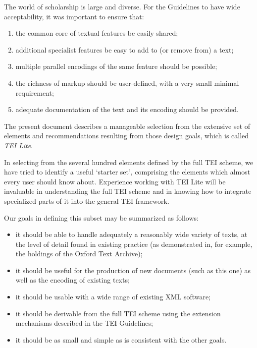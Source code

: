 \documentclass[11pt,twoside]{article}\makeatletter
\begin{document}
The world of scholarship is large and diverse. For the Guidelines to have wide acceptability, it was important to ensure that: \begin{enumerate}

\item the common core of textual features be easily shared;
\item additional specialist features be easy to add to (or remove from) a text;
\item multiple parallel encodings of the same feature should be possible;
\item the richness of markup should be user-defined, with a very small minimal requirement;
\item adequate documentation of the text and its encoding should be provided.
\end{enumerate}\par
The present document describes a manageable selection from the extensive set of elements and recommendations resulting from those design goals, which is called \textit{TEI Lite}.\par
In selecting from the  several hundred elements defined by the full TEI scheme, we have tried to identify a useful ‘starter set’, comprising the elements which almost every user should know about.  Experience working with TEI Lite will be invaluable in understanding the full TEI scheme and in knowing how to integrate specialized parts of it into the general TEI framework.\par
Our goals in defining this subset may be summarized as follows: \begin{itemize}

\item it should be able to handle adequately a reasonably wide variety of texts, at the level of detail found in existing practice (as demonstrated in, for example, the holdings of the Oxford Text Archive);
\item it should be useful for the production of new documents (such as this one) as well as the encoding of existing texts;
\item it should be usable with a wide range of existing XML software;
\item it should be derivable from the full TEI scheme using the extension mechanisms described in the TEI Guidelines;
\item it should be as small and simple as is consistent with the other goals.
\end{itemize}  \par
\end{document}
